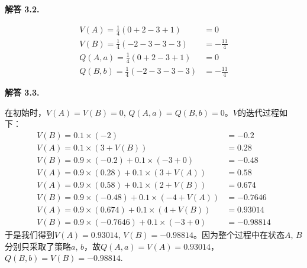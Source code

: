 \documentclass[12pt, a4paper, oneside]{ctexart}
\newenvironment{solution}[1]{\par\noindent\textbf{解答 #1. }\par}{\par}
\begin{document}
\begin{solution}{3.2}
    \begin{align}
        V(A)=\frac{1}{4}(0+2-3+1)&=0 \nonumber \\
        V(B)=\frac{1}{4}(-2-3-3-3)&=-\frac{11}{4} \nonumber \\ 
        Q(A,a)=\frac{1}{4}(0+2-3+1)&=0 \nonumber \\
        Q(B,b)=\frac{1}{4}(-2-3-3-3)&=-\frac{11}{4} \nonumber
    \end{align}
\end{solution}

\begin{solution}{3.3}
    在初始时，$V(A)=V(B)=0$, $Q(A,a)=Q(B,b)=0$。$V$的迭代过程如下：
    \begin{align}
        V(B)=0.1\times(-2)&=-0.2 \nonumber \\
        V(A)=0.1\times(3+V(B))&=0.28 \nonumber \\
        V(B)=0.9\times(-0.2)+0.1\times(-3+0)&=-0.48 \nonumber \\
        V(A)=0.9\times(0.28)+0.1\times(3+V(A))&=0.58 \nonumber \\
        V(A)=0.9\times(0.58)+0.1\times(2+V(B))&=0.674 \nonumber \\
        V(B)=0.9\times(-0.48)+0.1\times(-4+V(A))&=-0.7646 \nonumber \\
        V(A)=0.9\times(0.674)+0.1\times(4+V(B))&=0.93014 \nonumber \\
        V(B)=0.9\times(-0.7646)+0.1\times(-3+0)&=-0.98814 \nonumber
    \end{align}
    于是我们得到$V(A)=0.93014$, $V(B)=-0.98814$。因为整个过程中在状态$A$, $B$分别只采取了策略$a$, $b$，故$Q(A, a)=V(A)=0.93014$，$Q(B, b)=V(B)=-0.98814$.
\end{solution}
\end{document}
